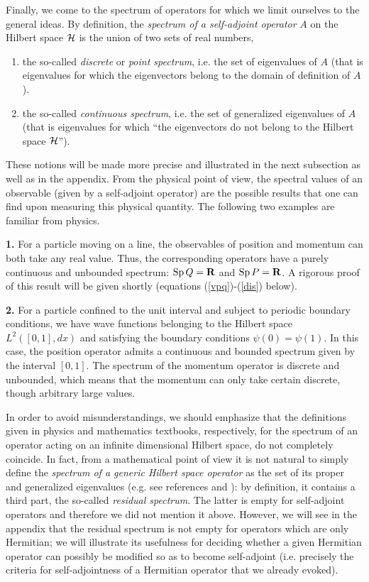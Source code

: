 \documentclass[12pt]{report}
\begin{document}
Finally, we come to the spectrum of operators
for which we limit ourselves to the general ideas. 
By definition, the {\em spectrum of a self-adjoint operator} 
$A$ on the Hilbert space ${\cal H}$ 
is the union of two sets of real numbers, 
\begin{enumerate}
\item
the so-called {\em discrete} or {\em point spectrum},
i.e. the set of eigenvalues of $A$
(that is eigenvalues for which 
the eigenvectors belong to the domain of definition 
of $A$).
\item
the so-called {\em continuous spectrum},
i.e. the set of generalized eigenvalues of $A$ (that is 
eigenvalues for which ``the eigenvectors do not belong to 
the Hilbert space ${\cal H}$'').
\end{enumerate}
These notions will be made more precise 
and illustrated in the next subsection as well as in the appendix. 
From the physical point of view, the spectral values of an  
observable (given by a self-adjoint operator)  
are the possible results
that one can find upon measuring this physical quantity. 
The following two examples are familiar from physics. 


\medskip 

\noindent
{\bf 1.}
For a particle moving on a line, the observables of position and
momentum can both take any real value. Thus, the corresponding 
operators have a purely continuous and unbounded spectrum:
${\rm Sp} \, Q = {\bf R}$ and ${\rm Sp} \, P = {\bf R}$. 
A rigorous proof of this result will be given shortly
(equations (\ref{vpq})-(\ref{dis}) below).

\medskip 

\noindent
{\bf 2.}
For a particle confined to the unit interval and subject to 
periodic boundary conditions, we have 
wave functions belonging to the Hilbert space 
$L^2 ( [0,1],dx)$ 
and satisfying the boundary conditions 
$\psi (0) = \psi (1)$. 
In this case, the position operator 
admits a continuous and bounded spectrum given by the interval  
$[0,1]$. The spectrum of the momentum operator 
is discrete and unbounded, 
which means that the momentum can only take certain discrete, though 
arbitrary large values. 

\medskip 

In order to avoid misunderstandings, we should emphasize that the
definitions given in physics and mathematics 
textbooks, respectively, for the spectrum of an operator acting on 
an infinite dimensional Hilbert space, do not completely coincide.
In fact, from a mathematical point of view it is not  
natural to simply define 
the {\em spectrum of a generic Hilbert space operator} as 
the set of its proper and generalized eigenvalues (e.g. see 
references \cite{jau} and \cite{sg}):
by definition, it contains a third part, the so-called 
{\em residual spectrum}. The latter 
is empty for self-adjoint operators  
and therefore we did not mention it above. 
However, we will see in the appendix that 
the residual spectrum is not empty 
for operators which are only Hermitian; 
we will illustrate its usefulness for 
deciding whether a given 
Hermitian operator can possibly be modified so as to become 
self-adjoint
(i.e. precisely the criteria for self-adjointness 
of a Hermitian operator that we  
already evoked). 
\end{document}
